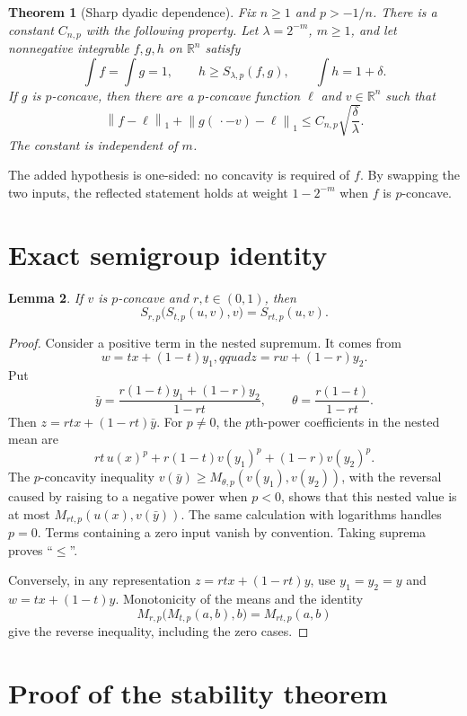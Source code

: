 \documentclass[11pt]{article}
\newtheorem{theorem}{Theorem}[section]
\newtheorem{lemma}[theorem]{Lemma}
\theoremstyle{remark}
\newcommand{\R}{\mathbb{R}}
\newcommand{\norm}[1]{\left\lVert#1\right\rVert_{1}}
\begin{document}
\begin{theorem}[Sharp dyadic dependence]\label{thm:main}
Fix $n\geq1$ and $p>-1/n$.  There is a constant $C_{n,p}$ with the
following property.  Let $\lambda=2^{-m}$, $m\geq1$, and let nonnegative
integrable $f,g,h$ on $\R^n$ satisfy
\[
 \int f=\int g=1,\qquad
 h\geq S_{\lambda,p}(f,g),\qquad
 \int h=1+\delta.
\]
If $g$ is $p$-concave, then there are a $p$-concave function $\ell$ and
$v\in\R^n$ such that
\[
 \norm{f-\ell}+\norm{g(\,\cdot-v)-\ell}
 \leq C_{n,p}\sqrt{\frac{\delta}{\lambda}}.
\]
The constant is independent of $m$.
\end{theorem}

The added hypothesis is one-sided: no concavity is required of $f$.  By
swapping the two inputs, the reflected statement holds at weight
$1-2^{-m}$ when $f$ is $p$-concave.

\section{Exact semigroup identity}

\begin{lemma}\label{lem:semigroup}
If $v$ is $p$-concave and $r,t\in(0,1)$, then
\[
 S_{r,p}\bigl(S_{t,p}(u,v),v\bigr)=S_{rt,p}(u,v).
\]
\end{lemma}

\begin{proof}
Consider a positive term in the nested supremum.  It comes from
\[
 w=tx+(1-t)y_1,qquad z=rw+(1-r)y_2.
\]
Put
\[
 \bar y=\frac{r(1-t)y_1+(1-r)y_2}{1-rt},
 \qquad
 \theta=\frac{r(1-t)}{1-rt}.
\]
Then $z=rtx+(1-rt)\bar y$.  For $p\ne0$, the $p$th-power coefficients in
the nested mean are
\[
 rt\,u(x)^p+r(1-t)v(y_1)^p+(1-r)v(y_2)^p.
\]
The $p$-concavity inequality
$v(\bar y)\geq M_{\theta,p}(v(y_1),v(y_2))$, with the reversal caused by
raising to a negative power when $p<0$, shows that this nested value is at
most $M_{rt,p}(u(x),v(\bar y))$.  The same calculation with logarithms
handles $p=0$.  Terms containing a zero input vanish by convention.
Taking suprema proves ``$\leq$''.

Conversely, in any representation $z=rtx+(1-rt)y$, use $y_1=y_2=y$ and
$w=tx+(1-t)y$.  Monotonicity of the means and the identity
\[
 M_{r,p}\bigl(M_{t,p}(a,b),b\bigr)=M_{rt,p}(a,b)
\]
give the reverse inequality, including the zero cases.
\end{proof}

\section{Proof of the stability theorem}
\end{document}
